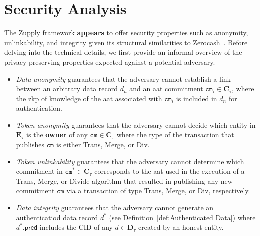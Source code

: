 \section{Security Analysis}

The Zupply framework \textbf{appears} to offer security properties such as anonymity, unlinkability, and integrity given its structural similarities to Zerocash~\cite{zcash-proc}. Before delving into the technical details, we first provide an informal overview of the privacy-preserving properties expected against a potential adversary.

\begin{itemize}
	\item \textit{Data anonymity} guarantees that the adversary cannot establish a link between an arbitrary data record $d_n$ and an \gls{aat} commitment  $\texttt{cm}_i \in \mathbf{C}_\tau$, where the  \gls{zkp} of knowledge of the \gls{aat} associated with $\texttt{cm}_i$ is included in $d_n$ for authentication. 
	
	\item  \textit{Token anonymity} guarantees that the adversary cannot decide which entity in $\mathbf{E}_\tau$ is the \textbf{owner} of any  $\texttt{cm} \in \mathbf{C}_\tau$ where the type of the transaction that publishes $\texttt{cm}$ is either \textsf{Trans}, \textsf{Merge}, or \textsf{Div}.  
	
	\item  \textit{Token unlinkability} guarantees that the adversary cannot determine which commitment in $\texttt{cm}^\ast\in\mathbf{C}_\tau$ corresponds to the \gls{aat} used in the execution of a \textsf{Trans}, \textsf{Merge}, or \textsf{Divide} algorithm that resulted in publishing any new commitment $\texttt{cm}$ via a transaction of type \textsf{Trans}, \textsf{Merge}, or \textsf{Div}, respectively.
	
	\item  \textit{Data integrity} guarantees that the adversary cannot generate an authenticatiod data record $d^*$ (see Definition~\ref{def:Authenticated Data}) where $d^*.\textsf{pred}$ includes the \textsc{CID} of any $d \in \mathbf{D}_\tau$ created by an honest entity.
	
	
\end{itemize}

